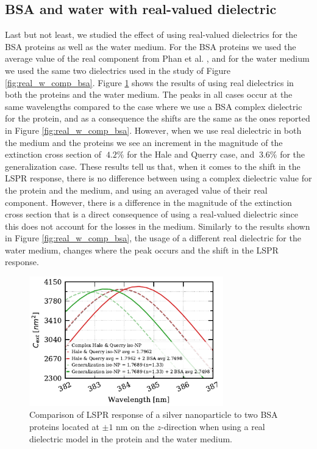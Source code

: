  \subsection{BSA and water with real-valued dielectric}

Last but not least, we studied the effect of using real-valued dielectrics for the BSA proteins as well as the water medium. For the BSA proteins 
we used the average value of the real component from Phan et al. \cite{PhanETal2013}, and for the water medium we used the same two dielectrics 
used in the study of Figure \ref{fig:real_w_comp_bsa}. Figure \ref{fig:bsa_w_real} shows the results of using real dielectrics in both the proteins and
the water medium. The peaks in all cases occur at the same wavelengths compared to the case where we use a BSA complex dielectric for the protein, and as a 
consequence the shifts are the same as the ones reported in Figure \ref{fig:real_w_comp_bsa}. However, when we use real dielectric in both the medium 
and the proteins we see an increment in the magnitude of the extinction cross section of $~4.2\%$ for the Hale and Querry case, and $~3.6\%$ for the 
generalization case. These results tell us that, when it comes to the shift in the LSPR response, there is no difference between using a complex dielectric 
value for the protein and the medium, and using an averaged value of their real component. However, there is a difference in the magnitude of the 
extinction cross section that is a direct consequence of using a real-valued dielectric since this does not account for the losses in the medium. Similarly to the 
results shown in Figure \ref{fig:real_w_comp_bsa}, the usage of a different real dielectric for the water medium, changes where the peak occurs and the shift in the 
LSPR response. 

 \begin{figure} %
    \centering
    \includegraphics[width=0.75\textwidth]{bsa_phan_avg_real_water_diel.pdf} 
    \caption{Comparison of LSPR response of a silver nanoparticle to two BSA proteins located at $\pm1$ nm on the $z$-direction
    when using a real dielectric model in the protein and the water medium.}
    \label{fig:bsa_w_real}
 \end{figure}

